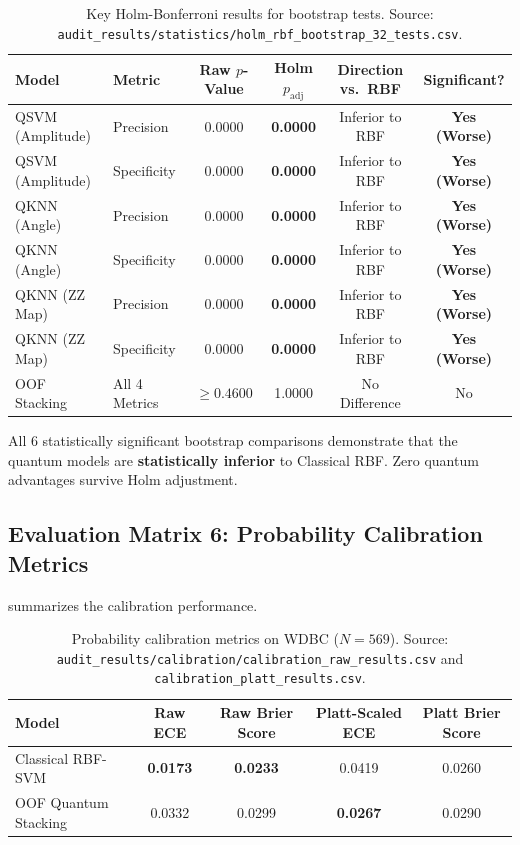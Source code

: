 \begin{table}[H]
\centering
\small
\caption{Key Holm-Bonferroni results for bootstrap tests. Source: \texttt{audit\_results/statistics/holm\_rbf\_bootstrap\_32\_tests.csv}.}
\label{tab:holm-bootstrap-key}
\begin{tabularx}{\textwidth}{llcccc}
\toprule
\textbf{Model} & \textbf{Metric} & \textbf{Raw $p$-Value} & \textbf{Holm $p_{\mathrm{adj}}$} & \textbf{Direction vs.\ RBF} & \textbf{Significant?} \\
\midrule
QSVM (Amplitude) & Precision   & 0.0000 & \textbf{0.0000} & Inferior to RBF & \textbf{Yes (Worse)} \\
QSVM (Amplitude) & Specificity & 0.0000 & \textbf{0.0000} & Inferior to RBF & \textbf{Yes (Worse)} \\
QKNN (Angle)     & Precision   & 0.0000 & \textbf{0.0000} & Inferior to RBF & \textbf{Yes (Worse)} \\
QKNN (Angle)     & Specificity & 0.0000 & \textbf{0.0000} & Inferior to RBF & \textbf{Yes (Worse)} \\
QKNN (ZZ Map)    & Precision   & 0.0000 & \textbf{0.0000} & Inferior to RBF & \textbf{Yes (Worse)} \\
QKNN (ZZ Map)    & Specificity & 0.0000 & \textbf{0.0000} & Inferior to RBF & \textbf{Yes (Worse)} \\
\midrule
OOF Stacking & All 4 Metrics & $\ge 0.4600$ & 1.0000 & No Difference & No \\
\bottomrule
\end{tabularx}
\end{table}

All 6 statistically significant bootstrap comparisons demonstrate that the quantum models are \textbf{statistically inferior} to Classical RBF. Zero quantum advantages survive Holm adjustment.

\subsection{Evaluation Matrix 6: Probability Calibration Metrics}
 summarizes the calibration performance.

\begin{table}[H]
\centering
\small
\caption{Probability calibration metrics on WDBC ($N=569$). Source: \texttt{audit\_results/calibration/calibration\_raw\_results.csv} and \texttt{calibration\_platt\_results.csv}.}
\label{tab:calibration-summary}
\begin{tabularx}{\textwidth}{lcccc}
\toprule
\textbf{Model} & \textbf{Raw ECE} & \textbf{Raw Brier Score} & \textbf{Platt-Scaled ECE} & \textbf{Platt Brier Score} \\
\midrule
Classical RBF-SVM     & \textbf{0.0173} & \textbf{0.0233} & 0.0419 & 0.0260 \\
OOF Quantum Stacking  & 0.0332 & 0.0299 & \textbf{0.0267} & 0.0290 \\
\bottomrule
\end{tabularx}
\end{table}

